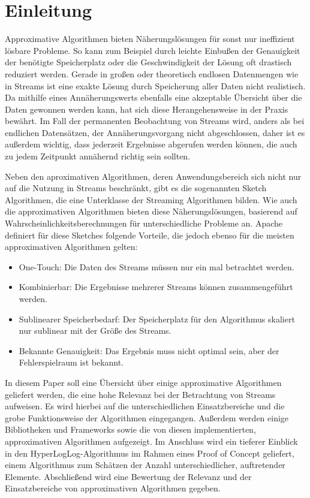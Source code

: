 \section{Einleitung}

Approximative Algorithmen bieten Näherungslösungen für sonst nur ineffizient lösbare Probleme.
So kann zum Beispiel durch leichte Einbußen der Genauigkeit der benötigte Speicherplatz oder die Geschwindigkeit der Lösung oft drastisch reduziert werden.
Gerade in großen oder theoretisch endlosen Datenmengen wie in Streams ist eine exakte Lösung durch Speicherung aller Daten nicht realistisch.
Da mithilfe eines Annäherungswerts ebenfalls eine akzeptable Übersicht über die Daten gewonnen werden kann, hat sich diese Herangehensweise in der Praxis bewährt.
Im Fall der permanenten Beobachtung von Streams wird, anders als bei endlichen Datensätzen, der Annäherungsvorgang nicht abgeschlossen, daher ist es außerdem wichtig, dass jederzeit Ergebnisse abgerufen werden können, die auch zu jedem Zeitpunkt annähernd richtig sein sollten.

Neben den aproximativen Algorithmen, deren Anwendungsbereich sich nicht nur auf die Nutzung in Streams beschränkt, gibt es die sogenannten Sketch Algorithmen, die eine Unterklasse der Streaming Algorithmen bilden.
Wie auch die approximativen Algorithmen bieten diese Näherungslösungen, basierend auf Wahrscheinlichkeitsberechnungen für unterschiedliche Probleme an.
Apache \cite{apachedatasketches} definiert für diese Sketches folgende Vorteile, die jedoch ebenso für die meisten approximativen Algorithmen gelten:

\begin{itemize}
	\item One-Touch: Die Daten des Streams müssen nur ein mal betrachtet werden.
	\item Kombinierbar: Die Ergebnisse mehrerer Streams können zusammengeführt werden.
	\item Sublinearer Speicherbedarf: Der Speicherplatz für den Algorithmus skaliert nur sublinear mit der Größe des Streams.
	\item Bekannte Genauigkeit: Das Ergebnis muss nicht optimal sein, aber der Fehlerspielraum ist bekannt.
\end{itemize}

In diesem Paper soll eine Übersicht über einige approximative Algorithmen geliefert werden, die eine hohe Relevanz bei der Betrachtung von Streams aufweisen.
Es wird hierbei auf die unterschiedlichen Einsatzbereiche und die grobe Funktionsweise der Algorithmen eingegangen.
Außerdem werden einige Bibliotheken und Frameworks sowie die von diesen implementierten, approximativen Algorithmen aufgezeigt.
Im Anschluss wird ein tieferer Einblick in den HyperLogLog-Algorithmus im Rahmen eines Proof of Concept geliefert, einem Algorithmus zum Schätzen der Anzahl unterschiedlicher, auftretender Elemente.
Abschließend wird eine Bewertung der Relevanz und der Einsatzbereiche von approximativen Algorithmen gegeben.